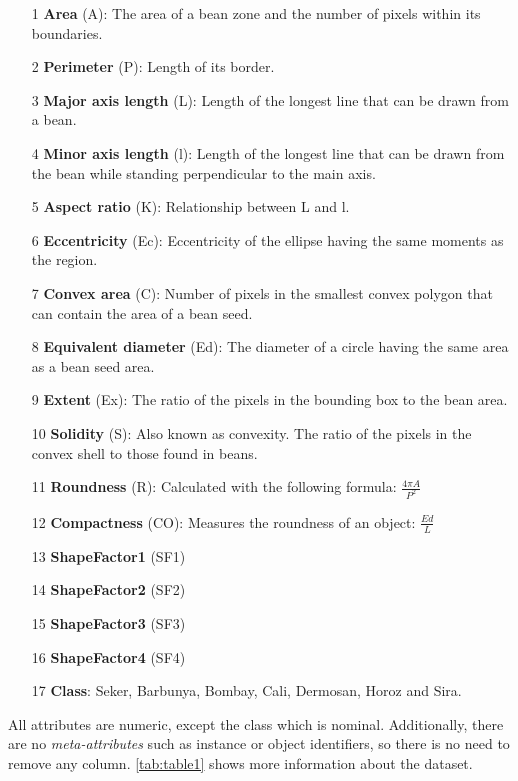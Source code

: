 \documentclass[a4paper,11pt]{article}
\begin{document}
\begin{itemize}
\setlength\itemsep{-1ex}
\item[1] \textbf{Area} (A): The area of a bean zone and the number of pixels within its boundaries.
\item[2] \textbf{Perimeter} (P): Length of its border.
\item[3] \textbf{Major axis length} (L): Length of the longest line that can be drawn from a bean.
\item[4] \textbf{Minor axis length} (l): Length of the longest line that can be drawn from the bean while standing perpendicular to the main axis.
\item[5] \textbf{Aspect ratio} (K): Relationship between L and l.
\item[6] \textbf{Eccentricity} (Ec): Eccentricity of the ellipse having the same moments as the region.
\item[7] \textbf{Convex area} (C): Number of pixels in the smallest convex polygon that can contain the area of a bean seed.
\item[8] \textbf{Equivalent diameter} (Ed): The diameter of a circle having the same area as a bean seed area.
\item[9] \textbf{Extent} (Ex): The ratio of the pixels in the bounding box to the bean area.
\item[10] \textbf{Solidity} (S): Also known as convexity. The ratio of the pixels in the convex shell to those found in beans.
\item[11] \textbf{Roundness} (R): Calculated with the following formula: $\frac{4\pi A}{P^2}$
\item[12] \textbf{Compactness} (CO): Measures the roundness of an object: $\frac{Ed}{L}$
\item[13] \textbf{ShapeFactor1} (SF1)
\item[14] \textbf{ShapeFactor2} (SF2)
\item[15] \textbf{ShapeFactor3} (SF3)
\item[16] \textbf{ShapeFactor4} (SF4)
\item[17] \textbf{Class}: Seker, Barbunya, Bombay, Cali, Dermosan, Horoz and Sira.
\end{itemize}

All attributes are numeric, except the class which is nominal. Additionally, there are no \textit{meta-attributes} such as instance or object identifiers, so there is no need to remove any column. \autoref{tab:table1} shows more information about the dataset.
\end{document}
